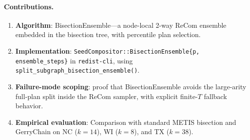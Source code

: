 \paragraph{Contributions.}
\begin{enumerate}
  \item \textbf{Algorithm}: BisectionEnsemble---a node-local 2-way ReCom
        ensemble embedded in the bisection tree, with percentile plan selection.
  \item \textbf{Implementation}: \texttt{SeedCompositor::BisectionEnsemble\{p, ensemble\_steps\}}
        in \texttt{redist-cli}, using \texttt{split\_subgraph\_bisection\_ensemble()}.
  \item \textbf{Failure-mode scoping}: proof that BisectionEnsemble avoids the
        large-arity full-plan split inside the ReCom sampler, with explicit
        finite-$T$ fallback behavior.
  \item \textbf{Empirical evaluation}: Comparison with standard METIS bisection
        and GerryChain on NC ($k=14$), WI ($k=8$), and TX ($k=38$).
\end{enumerate}
